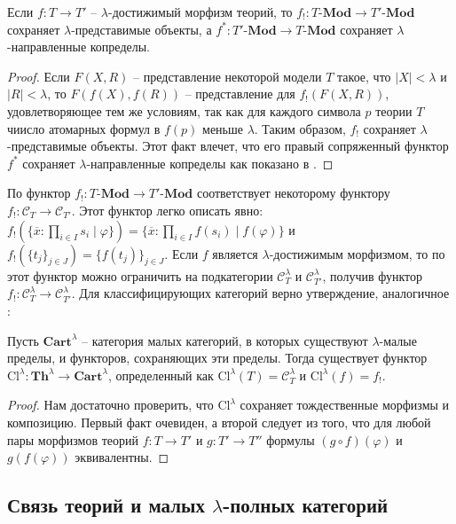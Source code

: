 \documentclass[reqno]{amsart}
\theoremstyle{definition}
\theoremstyle{remark}
\newcommand{\bcat}[1]{\mathbf{#1}}
\newcommand{\cat}[1]{\mathcal{#1}}
\newcommand{\Mod}[1]{#1\text{-}\bcat{Mod}}
\newcommand{\fs}[1]{\mathrm{#1}}
\newcommand{\Th}{\bcat{Th}}
\begin{document}
\begin{lem}
Если $f : T \to T'$ -- $\lambda$-достижимый морфизм теорий, то $f_! : \Mod{T} \to \Mod{T'}$ сохраняет $\lambda$-представимые объекты, а $f^* : \Mod{T'} \to \Mod{T}$ сохраняет $\lambda$-направленные копределы.
\end{lem}
\begin{proof}
Если $F(X,R)$ -- представление некоторой модели $T$ такое, что $|X| < \lambda$ и $|R| < \lambda$, то $F(f(X),f(R))$ -- представление для $f_!(F(X,R))$, удовлетворяющее тем же условиям,
так как для каждого символа $p$ теории $T$ чиисло атомарных формул в $f(p)$ меньше $\lambda$.
Таким образом, $f_!$ сохраняет $\lambda$-представимые объекты.
Этот факт влечет, что его правый сопряженный функтор $f^*$ сохраняет $\lambda$-направленные копределы как показано в \cite[Theorem~1.66]{LPC}.
\end{proof}

По  функтор $f_! : \Mod{T} \to \Mod{T'}$ соответствует некоторому функтору $f_! : \cat{C}_T \to \cat{C}_{T'}$.
Этот функтор легко описать явно: $f_!(\{ \overline{x} : \prod_{i \in I} s_i \mid \varphi \}) = \{ \overline{x} : \prod_{i \in I} f(s_i) \mid f(\varphi) \}$ и $f_!(\{ t_j \}_{j \in J}) = \{ f(t_j) \}_{j \in J}$.
Если $f$ является $\lambda$-достижимым морфизмом, то по  этот функтор можно ограничить на подкатегории $\cat{C}_T^\lambda$ и $\cat{C}_{T'}^\lambda$, получив функтор $f_! : \cat{C}_T^\lambda \to \cat{C}_{T'}^\lambda$.
Для классифицирующих категорий верно утверждение, аналогичное :
\begin{prop}[th-func-cl]
Пусть $\bcat{Cart}^\lambda$ -- категория малых категорий, в которых существуют $\lambda$-малые пределы, и функторов, сохраняющих эти пределы.
Тогда существует функтор $\fs{Cl}^\lambda : \Th^\lambda \to \bcat{Cart}^\lambda$, определенный как $\fs{Cl}^\lambda(T) = \cat{C}_T^\lambda$ и $\fs{Cl}^\lambda(f) = f_!$.
\end{prop}
\begin{proof}
Нам достаточно проверить, что $\fs{Cl}^\lambda$ сохраняет тождественные морфизмы и композицию.
Первый факт очевиден, а второй следует из того, что для любой пары морфизмов теорий $f : T \to T'$ и $g : T' \to T''$ формулы $(g \circ f)(\varphi)$ и $g(f(\varphi))$ эквивалентны.
\end{proof}

\subsection{Связь теорий и малых $\lambda$-полных категорий}
\end{document}
